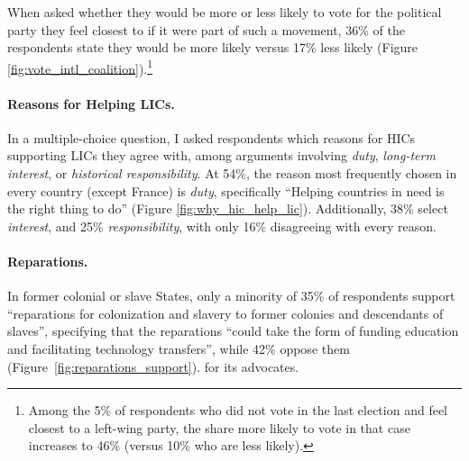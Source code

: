 \documentclass[12pt,english]{article}
\begin{document}
\begin{bibunit}
When asked whether they would be more or less likely to vote for the political party they feel closest to if it were part of such a movement, 36\% of the respondents state they would be more likely versus 17\% less likely (Figure \ref{fig:vote_intl_coalition}).\footnote{Among the 5\% of respondents who did not vote in the last election and feel closest to a left-wing party, the share more likely to vote in that case increases to 46\% (versus 10\% who are less likely).}

\paragraph{Reasons for Helping LICs.}\label{par:why_help_lic}

In a multiple-choice question, I asked respondents which reasons for HICs supporting LICs they agree with, among arguments involving \textit{duty}, \textit{long-term interest}, or \textit{historical responsibility}. At 54\%, the reason most frequently chosen in every country (except France) is \textit{duty}, specifically ``Helping countries in need is the right thing to do'' (Figure \ref{fig:why_hic_help_lic}). Additionally, 38\% select \textit{interest}, and 25\% \textit{responsibility}, with only 16\% disagreeing with every reason.

\paragraph{Reparations.}\label{par:reparations}


In former colonial or slave States, only a minority of 35\% of respondents support ``reparations for colonization and slavery to former colonies and descendants of slaves'', specifying that the reparations ``could take the form of funding education and facilitating technology transfers'', while 42\% oppose them (Figure~\ref{fig:reparations_support}). %
for its advocates.


\end{bibunit}
\end{document}
